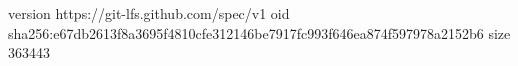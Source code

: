 version https://git-lfs.github.com/spec/v1
oid sha256:e67db2613f8a3695f4810cfe312146be7917fc993f646ea874f597978a2152b6
size 363443
